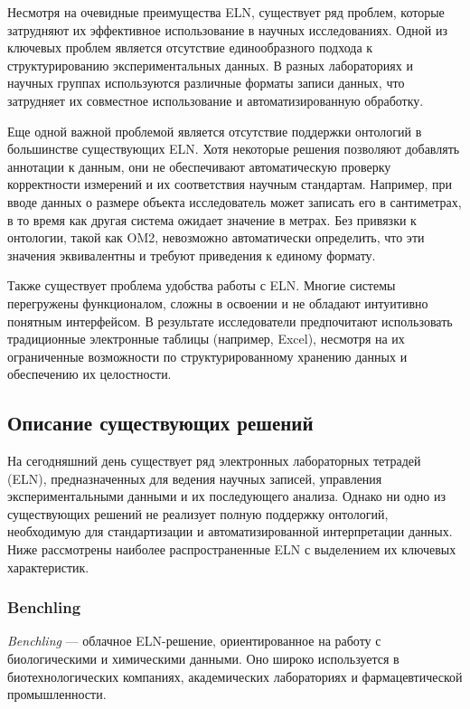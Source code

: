 Несмотря на очевидные преимущества ELN, существует ряд проблем, которые затрудняют их эффективное использование в научных исследованиях. Одной из ключевых проблем является отсутствие единообразного подхода к структурированию экспериментальных данных. В разных лабораториях и научных группах используются различные форматы записи данных, что затрудняет их совместное использование и автоматизированную обработку.

Еще одной важной проблемой является отсутствие поддержки онтологий в большинстве существующих ELN. Хотя некоторые решения позволяют добавлять аннотации к данным, они не обеспечивают автоматическую проверку корректности измерений и их соответствия научным стандартам. Например, при вводе данных о размере объекта исследователь может записать его в сантиметрах, в то время как другая система ожидает значение в метрах. Без привязки к онтологии, такой как OM2, невозможно автоматически определить, что эти значения эквивалентны и требуют приведения к единому формату.

Также существует проблема удобства работы с ELN. Многие системы перегружены функционалом, сложны в освоении и не обладают интуитивно понятным интерфейсом. В результате исследователи предпочитают использовать традиционные электронные таблицы (например, Excel), несмотря на их ограниченные возможности по структурированному хранению данных и обеспечению их целостности.

\subsection{Описание существующих решений}

На сегодняшний день существует ряд электронных лабораторных тетрадей (ELN), предназначенных для ведения научных записей, управления экспериментальными данными и их последующего анализа. Однако ни одно из существующих решений не реализует полную поддержку онтологий, необходимую для стандартизации и автоматизированной интерпретации данных. Ниже рассмотрены наиболее распространенные ELN с выделением их ключевых характеристик.

\subsubsection{Benchling}
\textit{Benchling}\cite{ELN:Benchling} — облачное ELN-решение, ориентированное на работу с биологическими и химическими данными. Оно широко используется в биотехнологических компаниях, академических лабораториях и фармацевтической промышленности.

